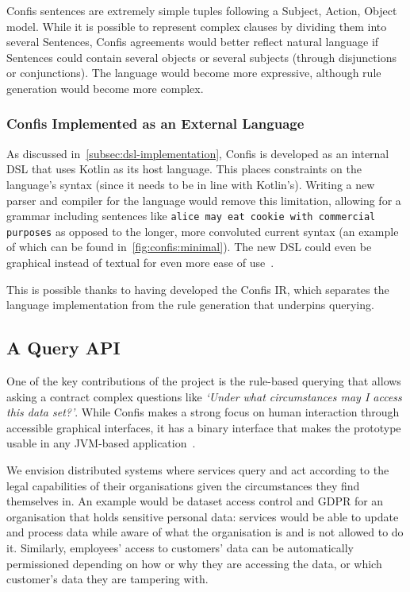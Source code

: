 Confis sentences are extremely simple tuples following a Subject, Action, Object model.
While it is possible to represent complex clauses by dividing them into several Sentences, Confis agreements would better reflect natural language if Sentences could contain several objects or several subjects (through disjunctions or conjunctions).
The language would become more expressive, although rule generation would become more complex.

\subsubsection{Confis Implemented as an External Language}\label{subsec:confis-as-external-language}

As discussed in~\autoref{subsec:dsl-implementation}, Confis is developed as an internal DSL that uses Kotlin as its host language.
This places constraints on the language's syntax (since it needs to be in line with Kotlin's).
Writing a new parser and compiler for the language would remove this limitation, allowing for a grammar including sentences like \texttt{alice may eat cookie with commercial purposes} as opposed to the longer, more convoluted current syntax (an example of which can be found in~\autoref{fig:confis:minimal}).
The new DSL could even be graphical instead of textual for even more ease of use~\cite{fowlerLangWorkbench}.

This is possible thanks to having developed the Confis IR, which separates the language implementation from the rule generation that underpins querying.

\subsection{A Query API}\label{subsec:future:query-api}
One of the key contributions of the project is the rule-based querying that allows asking a contract complex questions like \emph{`Under what circumstances may I access this data set?'}.
While Confis makes a strong focus on human interaction through accessible graphical interfaces, it has a binary interface that makes the prototype usable in any JVM-based application~\cite{venners1998java}.


We envision distributed systems where services query and act according to the legal capabilities of their organisations given the circumstances they find themselves in.
An example would be dataset access control and GDPR for an organisation that holds sensitive personal data: services would be able to update and process data while aware of what the organisation is and is not allowed to do it.
Similarly, employees' access to customers' data can be automatically permissioned depending on how or why they are accessing the data, or which customer's data they are tampering with.

